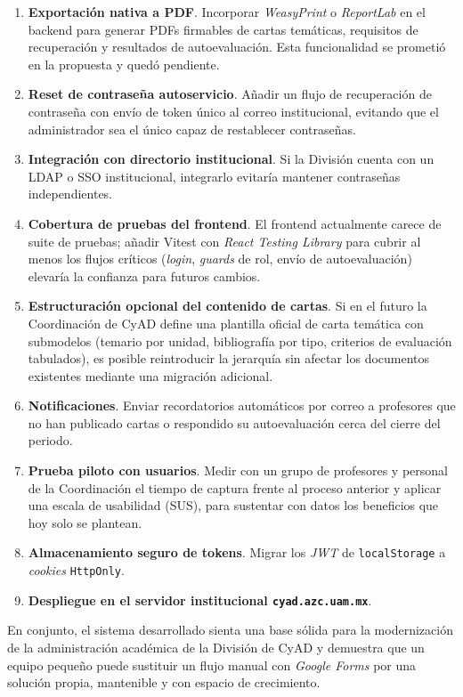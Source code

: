 \begin{enumerate}
    \item \textbf{Exportación nativa a PDF}. Incorporar \emph{WeasyPrint} o \emph{ReportLab} en el backend para generar PDFs firmables de cartas temáticas, requisitos de recuperación y resultados de autoevaluación. Esta funcionalidad se prometió en la propuesta y quedó pendiente.
    \item \textbf{Reset de contraseña autoservicio}. Añadir un flujo de recuperación de contraseña con envío de token único al correo institucional, evitando que el administrador sea el único capaz de restablecer contraseñas.
    \item \textbf{Integración con directorio institucional}. Si la División cuenta con un LDAP o SSO institucional, integrarlo evitaría mantener contraseñas independientes.
    \item \textbf{Cobertura de pruebas del frontend}. El frontend actualmente carece de suite de pruebas; añadir Vitest con \emph{React Testing Library} para cubrir al menos los flujos críticos (\emph{login}, \emph{guards} de rol, envío de autoevaluación) elevaría la confianza para futuros cambios.
    \item \textbf{Estructuración opcional del contenido de cartas}. Si en el futuro la Coordinación de CyAD define una plantilla oficial de carta temática con submodelos (temario por unidad, bibliografía por tipo, criterios de evaluación tabulados), es posible reintroducir la jerarquía sin afectar los documentos existentes mediante una migración adicional.
    \item \textbf{Notificaciones}. Enviar recordatorios automáticos por correo a profesores que no han publicado cartas o respondido su autoevaluación cerca del cierre del periodo.
    \item \textbf{Prueba piloto con usuarios}. Medir con un grupo de profesores y personal de la Coordinación el tiempo de captura frente al proceso anterior y aplicar una escala de usabilidad (SUS), para sustentar con datos los beneficios que hoy solo se plantean.
    \item \textbf{Almacenamiento seguro de tokens}. Migrar los \emph{JWT} de \texttt{localStorage} a \emph{cookies} \texttt{HttpOnly}.
    \item \textbf{Despliegue en el servidor institucional \texttt{cyad.azc.uam.mx}}.
\end{enumerate}

En conjunto, el sistema desarrollado sienta una base sólida para la modernización de la administración académica de la División de CyAD y demuestra que un equipo pequeño puede sustituir un flujo manual con \emph{Google Forms} por una solución propia, mantenible y con espacio de crecimiento.

\newpage
